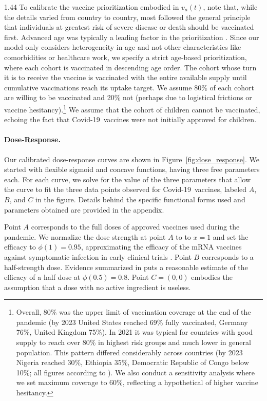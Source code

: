 \documentclass[12pt]{article}
\newcommand{\efficacy}{\phi}
\newcommand{\covid}{Covid-19}
\begin{document}
\begin{spacing}{1.44}
To calibrate the vaccine prioritization embodied in $v_a(t)$, note
that, while the details varied from country to country, most followed
the general principle that individuals at greatest risk of severe
disease or death should be vaccinated first. Advanced age was
typically a leading factor in the prioritization
\citep{WHO2020,Williams2021}. Since our model only considers
heterogeneity in age and not other characteristics like comorbidities
or healthcare work, we specify a strict age-based prioritization,
where each cohort is vaccinated in descending age order. The cohort
whose turn it is to receive the vaccine is vaccinated with the entire
available supply until cumulative vaccinations reach its uptake
target. We assume
80\% of each cohort are willing to be vaccinated and 20\% not (perhaps
due to logistical frictions or vaccine hesitancy).\footnote{Overall,
80\% was the upper limit of vaccination coverage at the end of the
pandemic (by 2023 United States reached 69\% fully vaccinated, Germany
76\%, United Kingdom 75\%). In 2021 it was typical for countries with
good supply to reach over 80\% in highest risk groups and much lower
in general population. This pattern differed considerably across
countries (by 2023 Nigeria reached 30\%, Ethiopia 35\%, Democratic
Republic of Congo below 10\%; all figures according to
\citet{OWID_COVID_Vax}). We also conduct a sensitivity analysis
where we set maximum coverage to 60\%, reflecting a hypothetical of
higher vaccine hesitancy.} We assume that the cohort of children
cannot be vaccinated, echoing the fact that \covid\ vaccines were not
initially approved for children.

\paragraph{Dose-Response.}

Our calibrated dose-response curves are shown in
Figure~\ref{fig:dose_response}. We started with flexible sigmoid and
concave functions, having three free parameters each. For each curve,
we solve for the value of the three parameters that allow the curve to
fit the three data points observed for \covid\ vaccines, labeled $A$,
$B$, and $C$ in the figure. Details behind the specific functional
forms used and parameters obtained are provided in the appendix.

Point $A$ corresponds to the full doses of approved vaccines used
during the pandemic. We normalize the dose strength at point $A$ to to
$x = 1$ and set the efficacy to $\efficacy(1) = 0.95$, approximating
the efficacy of the mRNA vaccines against symptomatic infection in
early clinical trials \citep{Baden2020,Polak2020}. Point $B$
corresponds to a half-strength dose. Evidence summarized in
\citet{Wiecek2022} puts a reasonable estimate of the efficacy of a
half dose at $\phi(0.5) = 0.8$. Point $C = (0,0)$ embodies the
assumption that a dose with no active ingredient is useless.


\end{spacing}
\end{document}
